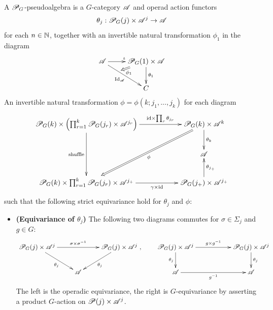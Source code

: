 \documentclass{article}
\begin{document}
\begin{defn}[$\cP_G$-pseudoalgebra]\label{defn_P_G_psalg}
    A $\cP_G$-pseudoalgebra is a $G$-category $\mathscr{A}$ and operad action functors
    \begin{align*}
        \theta_j:\mathscr{P}_G(j)\times \mathscr{A}^j\rightarrow\mathscr{A}
    \end{align*}
    for each $n\in\mathbb{N}$, together with an invertible natural transformation $\phi_1$ in the diagram
    \begin{align}
        \xymatrix{ 
        \A\ar[r]^{\iota}\ar[dr]_{\Id_\A} & \cP_G(1)\times\A\ar[d]^{\theta_1}\ar@{=>}[dl]+<26pt>^>>>>{\phi_1}\\ 
        & C
        }
    \end{align}
    An invertible natural transformation $\phi=\phi(k;j_1,...,j_k)$ for each diagram 
    \begin{align}
        \xymatrix{
            \cP_G(k) \times \left(\prod_{r=1}^k \cP_G(j_r)\times \A^{j_r}\right) \ar[dd]_-{\text{shuffle}} \ar[rr]^-{\id\times\prod_r\theta_{j_r}} && \cP_G(k)\times\A^k \ar[d]^-{\theta_k} \ar@{=>}[ddll]^-{\phi}\\
            && \A\\
            \cP_G(k)\times \prod_{r=1}^k\cP_G(j_r)\times \A^{j_+} \ar[rr]_-{\gamma\times\id} && \cP_G(j_+)\times\A^{j_+} \ar[u]_-{\theta_{j_+}}
        }
    \end{align}
    such that the following strict equivariance hold for $\theta_j$ and $\phi$:
    \begin{itemize}
        \item[(i)]\textbf{(Equivariance of $\theta_j$)} The following two diagrams commutes for $\sigma\in\Sigma_j$ and $g\in G$:
        \begin{align}
            \xymatrix{
                \cP_G(j)\times \A^j \ar[dr]_-{\theta_j}  \ar[rr]^-{\sigma\times\sigma^{-1}} && \cP_G(j)\times \A^j \ar[dl]^-{\theta_j}\\
                & \A
            },\quad\quad \xymatrix{
                \cP_G(j)\times \A^j \ar[d]_-{\theta_j}  \ar[rr]^-{g\times g^{-1}} && \cP_G(j)\times \A^j \ar[d]^-{\theta_j}\\
                \A \ar[rr]_-{g^{-1}} && \A
            }
        \end{align}
        The left is the operadic equivariance, the right is $G$-equivariance by asserting a product $G$-action on $\mathscr{P}(j)\times\mathscr{A}^j$.

\end{itemize}
\end{defn}
\end{document}
